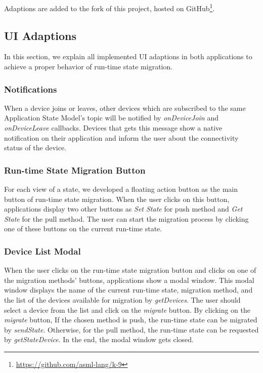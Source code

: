 Adaptions are added to the fork of this project, hosted on GitHub\footnote{\url{https://github.com/asml-lang/k-9}}. 


\subsection{UI Adaptions}
In this section, we explain all implemented UI adaptions in both applications to achieve a proper behavior of run-time state migration. 

\subsubsection{Notifications}
When a device joins or leaves, other devices which are subscribed to the same Application State Model's topic will be notified by \textit{onDeviceJoin} and \textit{onDeviceLeave} callbacks. Devices that gets this message show a native notification on their application and inform the user about the connectivity status of the device.

\subsubsection{Run-time State Migration Button}
For each view of a state, we developed a floating action button as the main button of run-time state migration. When the user clicks on this button, applications display two other buttons as \textit{Set State} for push method and \textit{Get State} for the pull method. The user can start the migration process by clicking one of these buttons on the current run-time state.

\subsubsection{Device List Modal}
When the user clicks on the run-time state migration button and clicks on one of the migration methods' buttons, applications show a modal window. This modal window displays the name of the current run-time state, migration method, and the list of the devices available for migration by \textit{getDevices}. The user should select a device from the list and click on the \textit{migrate} button. By clicking on the \textit{migrate} button, If the chosen method is push, the run-time state can be migrated by \textit{sendState}. Otherwise, for the pull method, the run-time state can be requested by \textit{getStateDevice}. In the end, the modal window gets closed. 

